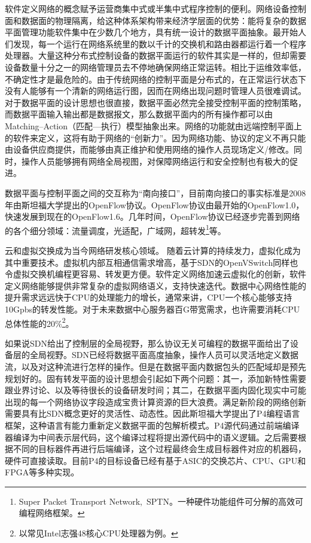 软件定义网络的概念赋予运营商集中式或半集中式程序控制的便利。网络设备控制面和数据面的物理隔离，给这种体系架构带来经济学层面的优势：能将复杂的数据平面管理功能软件集中在少数几个地方，具有统一设计的数据平面抽象。最开始人们发现，每一个运行在网络系统里的数以千计的交换机和路由器都运行着一个程序处理器。大量这种分布式控制设备的数据平面运行的软件其实是一样的，但却需要设备数量十分之一的网络管理员去不停地确保网络正常运转。相比于运维效率低，不确定性才是最危险的。由于传统网络的控制平面是分布式的，在正常运行状态下没有人能够有一个清新的网络运行图，因而在网络出现问题时管理人员很难调试。对于数据平面的设计思想也很直接，数据平面必然完全接受控制平面的控制策略，而数据平面输入输出都是数据报文，那么数据平面内的所有操作都可以由Matching--Action（匹配---执行）模型抽象出来。网络的功能就由远端控制平面上的软件来定义，这将有助于网络的“创新力”。因为网络功能、协议的定义不再只能由设备供应商提供，而能够由真正维护和使用网络的操作人员现场定义/修改。同时，操作人员能够拥有网络全局视图，对保障网络运行和安全控制也有极大的促进。

数据平面与控制平面之间的交互称为“南向接口”，目前南向接口的事实标准是2008年由斯坦福大学提出的OpenFlow协议。OpenFlow协议由最开始的OpenFlow1.0，快速发展到现在的OpenFlow1.6。几年时间，OpenFlow协议已经逐步完善到网络的各个细分领域：流量调度，光适配，广域网，超转发\footnote{Super Packet Transport Network,~SPTN。一种硬件功能组件可分解的高效可编程网络框架。}等。

云和虚拟交换成为当今网络研发核心领域。
随着云计算的持续发力，虚拟化成为其中重要技术。虚拟机内部互相通信需求增高，基于SDN的OpenVSwitch同样也令虚拟交换机编程更容易、转发更方便。软件定义网络加速云虚拟化的创新，软件定义网络能够提供非常复杂的虚拟网络语义，支持快速迭代。数据中心网络性能的提升需求远远快于CPU的处理能力的增长，通常来讲，CPU一个核心能够支持10Gpbs的转发性能。对于未来数据中心服务器百G带宽需求，也许需要消耗CPU总体性能的20\%\footnote{以常见Intel志强48核心CPU处理器为例。}。




如果说SDN给出了控制层的全局视野，那么协议无关可编程的数据平面给出了设备层的全局视野。SDN已经将数据平面高度抽象，操作人员可以灵活地定义数据流，以及对这种流进行怎样的操作。但是在数据平面内数据包头的匹配域却是预先规划好的。固有转发平面的设计思想会引起如下两个问题：其一，添加新特性需要跟业界讨论、以及等待很长的设备研发时间；其二，在数据平面内固化现实中可能出现的每一个网络协议字段造成宝贵计算资源的巨大浪费。满足新阶段的网络创新需要具有比SDN概念更好的灵活性、动态性。因此斯坦福大学提出了P4编程语言框架，这种语言有能力重新定义数据平面的包解析模式。P4源代码通过前端编译器编译为中间表示层代码，这个编译过程将提出源代码中的语义逻辑。之后需要根据不同的目标器件再进行后端编译，这个过程最终会生成目标器件对应的机器码，硬件可直接读取。目前P4的目标设备已经有基于ASIC的交换芯片、CPU、GPU和FPGA等多种实现。



